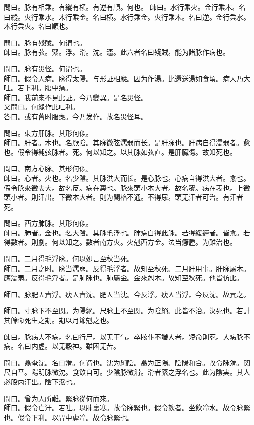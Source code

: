 問曰。脉有相乘。有縱有横。有逆有順。何也。
師曰。水行乘火。金行乘木。名曰縱。火行乘水。木行乘金。名曰横。水行乘金。火行乘木。名曰逆。金行乘水。木行乘火。名曰順也。

問曰。脉有殘賊。何谓也。\\
師曰。脉有弦。緊。浮。滑。沈。濇。此六者名曰殘賊。能为諸脉作病也。

問曰。脉有災怪。何谓也。\\
師曰。假令人病。脉得太陽。与形証相應。因为作湯。比還送湯如食頃。病人乃大吐。若下利。腹中痛。\\
師曰。我前來不見此証。今乃變異。是名災怪。\\
又問曰。何緣作此吐利。\\
答曰。或有舊时服藥。今乃发作。故名災怪耳。

問曰。東方肝脉。其形何似。\\
師曰。肝者。木也。名厥陰。其脉微弦濡弱而长。是肝脉也。肝病自得濡弱者。愈也。假令得純弦脉者。死。何以知之。以其脉如弦直。是肝臓傷。故知死也。

問曰。南方心脉。其形何似。\\
師曰。心者。火也。名少陰。其脉洪大而长。是心脉也。心病自得洪大者。愈也。假令脉來微去大。故名反。病在裏也。脉來頭小本大者。故名覆。病在表也。上微頭小者。則汗出。下微本大者。則为関格不通。不得尿。頭无汗者可治。有汗者死。

問曰。西方肺脉。其形何似。\\
師曰。肺者。金也。名大陰。其脉毛浮也。肺病自得此脉。若得緩遲者。皆愈。若得數者。則劇。何以知之。數者南方火。火剋西方金。法当癰腫。为難治也。

問曰。二月得毛浮脉。何以処言至秋当死。\\
師曰。二月之时。脉当濡弱。反得毛浮者。故知至秋死。二月肝用事。肝脉屬木。應濡弱。反得毛浮者。是肺脉也。肺屬金。金來剋木。故知至秋死。他皆仿此。

師曰。脉肥人責浮。瘦人責沈。肥人当沈。今反浮。瘦人当浮。今反沈。故責之。

師曰。寸脉下不至関。为陽絕。尺脉上不至関。为陰絕。此皆不治。決死也。若計其餘命死生之期。期以月節剋之也。

師曰。脉病人不病。名曰行尸。以无王气。卒眩仆不識人者。短命則死。人病脉不病。名曰内虗。以无穀神。雖困无苦。

問曰。翕奄沈。名曰滑。何谓也。沈为純陰。翕为正陽。陰陽和合。故令脉滑。関尺自平。陽明脉微沈。食飲自可。少陰脉微滑。滑者緊之浮名也。此为陰実。其人必股内汗出。陰下濕也。

問曰。曾为人所難。緊脉從何而來。\\
師曰。假令亡汗。若吐。以肺裏寒。故令脉緊也。假令欬者。坐飲冷水。故令脉緊也。假令下利。以胃中虗冷。故令脉緊也。

